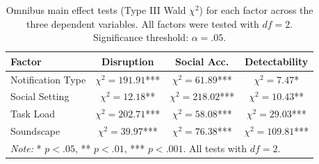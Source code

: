 \begin{table}[H]
\centering
\caption{Omnibus main effect tests (Type III Wald $\chi^2$) for each factor across the three dependent variables. All factors were tested with $df = 2$. Significance threshold: $\alpha = .05$.}
\label{tab:omnibus_tests}
\begin{tabular}{@{}lccc@{}}
\toprule
\textbf{Factor} & \textbf{Disruption} & \textbf{Social Acc.} & \textbf{Detectability} \\
\midrule
Notification Type & $\chi^2 = 191.91$*** & $\chi^2 = 61.89$*** & $\chi^2 = 7.47$*\hphantom{**} \\
Social Setting    & $\chi^2 = 12.18$**\hphantom{*}  & $\chi^2 = 218.02$*** & $\chi^2 = 10.43$**\hphantom{*} \\
Task Load         & $\chi^2 = 202.71$*** & $\chi^2 = 58.08$***  & $\chi^2 = 29.03$*** \\
Soundscape        & $\chi^2 = 39.97$***  & $\chi^2 = 76.38$***  & $\chi^2 = 109.81$*** \\
\bottomrule
\multicolumn{4}{l}{\small \textit{Note:} * $p < .05$, ** $p < .01$, *** $p < .001$. All tests with $df = 2$.}
\end{tabular}
\end{table}


